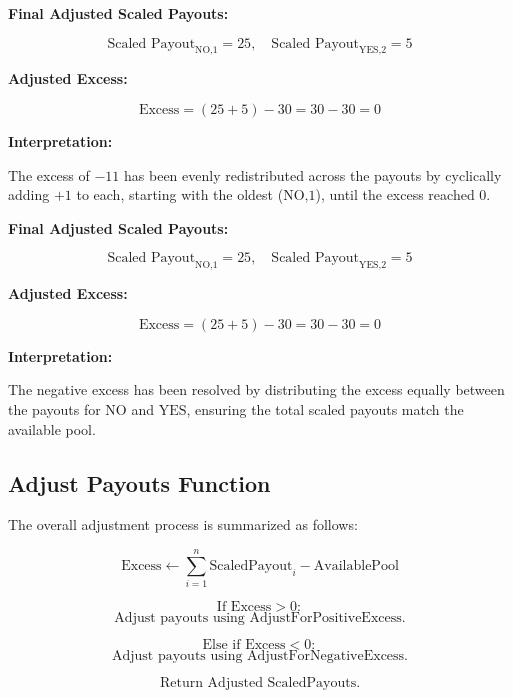 \documentclass{article}
\begin{document}
\textbf{Final Adjusted Scaled Payouts:}

\[
\text{Scaled Payout}_{\text{NO,1}} = 25, \quad \text{Scaled Payout}_{\text{YES,2}} = 5
\]

\textbf{Adjusted Excess:}

\[
\text{Excess} = (25 + 5) - 30 = 30 - 30 = 0
\]

\textbf{Interpretation:}

The excess of \(-11\) has been evenly redistributed across the payouts by cyclically adding \(+1\) to each, starting with the oldest (\(\text{NO,1}\)), until the excess reached \(0\).

\textbf{Final Adjusted Scaled Payouts:}

\[
\text{Scaled Payout}_{\text{NO,1}} = 25, \quad \text{Scaled Payout}_{\text{YES,2}} = 5
\]

\textbf{Adjusted Excess:}

\[
\text{Excess} = (25 + 5) - 30 = 30 - 30 = 0
\]

\textbf{Interpretation:}

The negative excess has been resolved by distributing the excess equally between the payouts for \(\text{NO}\) and \(\text{YES}\), ensuring the total scaled payouts match the available pool.


\subsection*{Adjust Payouts Function}

The overall adjustment process is summarized as follows:

\[
\text{Excess} \gets \sum_{i=1}^{n} \text{ScaledPayout}_i - \text{AvailablePool}
\]

\[
\text{If Excess} > 0:
\]
\[
\text{Adjust payouts using AdjustForPositiveExcess.}
\]

\[
\text{Else if Excess} < 0:
\]
\[
\text{Adjust payouts using AdjustForNegativeExcess.}
\]

\[
\text{Return Adjusted ScaledPayouts.}
\]



\begin{center}
\end{center}

\newpage
\end{document}
